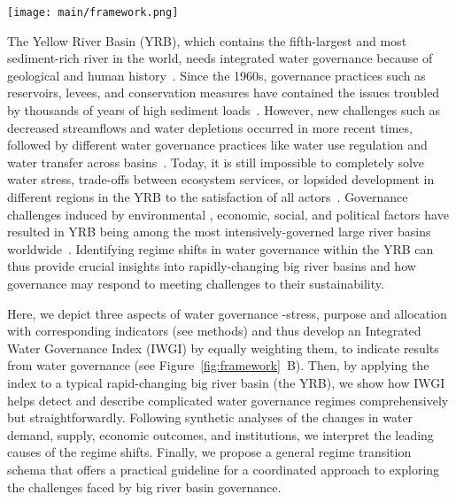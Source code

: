 \documentclass[draft]{../agujournal2019}
\begin{document}
\begin{figure*}[!ht]
	\centerline{
		\texttt{[image: main/framework.png]}
	}
	\caption{
		\textbf{A.} Identifying the water governance regimes in transitions of a hydrosocial cycle with an integrated water governance index (IWGI). Water stress (S), purposes of water services (P), and water allocation (A) are three aspects to be considered.
		For example, reservoir construction ( and ) can relieve local water stress; The development of intensive irrigated agriculture () and growth of energy industrial demand () will change the purpose of water use; The water delivery system controls water allocation ( and ) within the basin system.
		\textbf{B.} Therefore, the methodology is to combine three aspects' corresponding indicators, and then an abrupt change of the IWGI can indicate a regime shift in water governance.
	}\label{fig:framework}
\end{figure*}


The Yellow River Basin (YRB), which contains the fifth-largest and most sediment-rich river in the world, needs integrated water governance because of geological and human history~\cite{mostern2021,best2019}.
Since the 1960s, governance practices such as reservoirs, levees, and conservation measures have contained the issues troubled by thousands of years of high sediment loads~\cite{wang2016a,song2020}.
However, new challenges such as decreased streamflows and water depletions occurred in more recent times, followed by different water governance practices like water use regulation and water transfer across basins~\cite{wang2019c}.
Today, it is still impossible to completely solve water stress, trade-offs between ecosystem services, or lopsided development in different regions in the YRB to the satisfaction of all actors~\cite{wohlfart2016}.
Governance challenges induced by environmental
, economic, social, and political factors have resulted in YRB being among the most intensively-governed large river basins worldwide~\cite{nickum2021}.
Identifying regime shifts in water governance within the YRB can thus provide crucial insights into rapidly-changing big river basins and how governance may respond to meeting challenges to their sustainability.

Here, we depict three aspects of water governance -stress, purpose and allocation with corresponding indicators (see methods) and thus develop an Integrated Water Governance Index (IWGI) by equally weighting them, to indicate results from water governance (see Figure~\ref{fig:framework}~B).
Then, by applying the index to a typical rapid-changing big river basin (the YRB), we show how IWGI helps detect and describe complicated water governance regimes comprehensively but straightforwardly.
Following synthetic analyses of the changes in water demand, supply, economic outcomes, and institutions, we interpret the leading causes of the regime shifts.
Finally, we propose a general regime transition schema that offers a practical guideline for a coordinated approach to exploring the challenges faced by big river basin governance.
\end{document}
